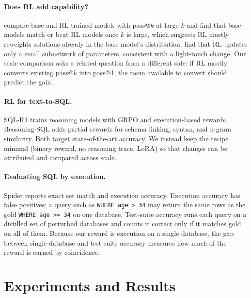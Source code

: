 \documentclass[11pt]{article}
\begin{document}
\paragraph{Does RL add capability?}
\citet{yue2025limit} compare base and RL-trained models with pass@$k$
\citep{chen2021codex} at large $k$ and find that base models match or beat RL
models once $k$ is large, which suggests RL mostly reweights solutions already
in the base model's distribution. \citet{mukherjee2025subnetworks} find that RL
updates only a small subnetwork of parameters, consistent with a light-touch
change. Our scale comparison asks a related question from a different side: if
RL mostly converts existing pass@$k$ into pass@1, the room available to convert
should predict the gain.

\paragraph{RL for text-to-SQL.}
SQL-R1 \citep{ma2025sqlr1} trains reasoning models with GRPO and execution-based
rewards. Reasoning-SQL \citep{pourreza2025reasoningsql} adds partial rewards for
schema linking, syntax, and n-gram similarity. Both target state-of-the-art
accuracy. We instead keep the recipe minimal (binary reward, no reasoning
trace, LoRA) so that changes can be attributed and compared across scale.

\paragraph{Evaluating SQL by execution.}
Spider \citep{yu2018spider} reports exact set match and execution accuracy.
Execution accuracy has false positives: a query such as \texttt{WHERE age > 34}
may return the same rows as the gold \texttt{WHERE age >= 34} on one database.
Test-suite accuracy \citep{zhong2020testsuite} runs each query on a distilled
set of perturbed databases and counts it correct only if it matches gold on all
of them. Because our reward is execution on a single database, the gap between
single-database and test-suite accuracy measures how much of the reward is
earned by coincidence.

\section{Experiments and Results}
\end{document}
